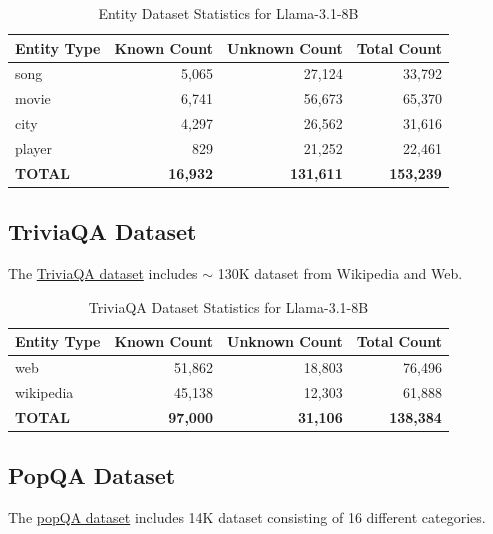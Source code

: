 \documentclass{article} %
\begin{document}
\label{app: dataset}
\begin{table}[H]
\centering
\caption{Entity Dataset Statistics for Llama-3.1-8B}
\label{tab:entity_stats}
\begin{tabular}{lrrr}
\toprule
\textbf{Entity Type} & \textbf{Known Count} & \textbf{Unknown Count} & \textbf{Total Count} \\
\midrule
song & 5,065 & 27,124 & 33,792 \\
movie & 6,741 & 56,673 & 65,370 \\
city & 4,297 & 26,562 & 31,616 \\
player & 829 & 21,252 & 22,461 \\
\midrule
\textbf{TOTAL} & \textbf{16,932} & \textbf{131,611} & \textbf{153,239} \\
\bottomrule
\end{tabular}
\end{table}

\subsection{TriviaQA Dataset}
\label{app:triviaqa_dataset}

The \href{https://huggingface.co/datasets/mandarjoshi/trivia_qa}{TriviaQA dataset}  \citep{joshi2017triviaqa} includes $\sim$ 130K dataset from Wikipedia and Web. 

\begin{table}[htbp]
\centering
\caption{TriviaQA Dataset Statistics for Llama-3.1-8B}
\label{tab:triviaqa_stats}
\begin{tabular}{lrrr}
\toprule
\textbf{Entity Type} & \textbf{Known Count} & \textbf{Unknown Count} & \textbf{Total Count} \\
\midrule
web & 51,862 & 18,803 & 76,496 \\
wikipedia & 45,138 & 12,303 & 61,888 \\
\midrule
\textbf{TOTAL} & \textbf{97,000} & \textbf{31,106} & \textbf{138,384} \\
\bottomrule
\end{tabular}
\end{table}


\subsection{PopQA Dataset}
\label{app:popqa_dataset}
The \href{https://huggingface.co/datasets/akariasai/PopQA}{popQA dataset} \citep{mallen2023popqa} includes 14K dataset consisting of 16 different categories.
\end{document}
